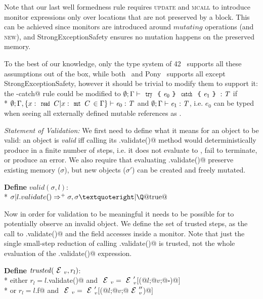 
Note that our last well formedness rule requires 
\textsc{update} and \textsc{mcall} to introduce
monitor expressions only over locations
that are not preserved by a \Q@try@ block.
This can be achieved since monitors are introduced
around $\mathit{mutating}$ operations
(and \textsc{new}),
and StrongExceptionSafety ensures no mutation happens on the preserved memory.

To the best of our knowledge, only the type system of 42~\cite{ServettoEtAl13a,ServettoZucca15}
 supports all these assumptions out of the box,
while both~\cite{GordonEtAl12} and Pony~\cite{clebsch2015deny,clebsch2017orca} supports all except StrongExceptionSafety,
however it should be trivial to modify them to support it:
the \Q@try-catch@ rule could be modified to
$\emptyset;\Gamma\vdash\Kw{try}\oC\e_0\cC\Kw{catch}\oC\e_1\cC:\T$
if\\* $\emptyset;
\Gamma,\{x:\Kw{read}\,C | x:\Kw{mut}\,C\,\in\Gamma\}
\vdash\e_0:\T$ and $\emptyset;\Gamma\vdash\e_1:\T$,
i.e. $e_0$ can be typed when seeing all externally defined mutable references as \Q@read@.

\loseSpace
\noindent\textit{Statement of Validation:}
We first need to define what it means for an object to be valid: an object is \emph{valid} iff calling its \Q@.validate()@ method would
deterministically produce \Q@true@ in a finite number of steps, i.e. it does not evaluate to \Q@false@, fail to terminate, or produce an error.
We also require that evaluating \Q@.validate()@ preserve existing memory ($\sigma$), but new objects ($\sigma'$) can be created and freely mutated.

\noindent\textbf{Define} $valid(\sigma,l)$:\\*
\indent $\sigma | l.validate()\Rightarrow^+ \sigma,\sigma’ | \text{\Q@true@}$

\noindent Now in order for validation to be meaningful it needs to be possible for \Q@validate@ to potentially observe an invalid object.
We define the set of trusted steps, 
as the call to \Q@.validate()@ and the field accesses inside a monitor.
Note that just the single small-step reduction
of calling \Q@.validate()@ is trusted, not the whole evaluation of the \Q@.validate()@ expression.


\noindent\textbf{Define} $\mathit{trusted}(\ctx_v,r_l)$:\\*
\indent either
$r_l=l$\Q@.validate()@ and
 $\ctx_v=\ctx_v'[$\Q@M(@$l$\Q@;@$v$\Q@;@$\square$\Q@)@$]$\\*
\indent or
$r_l=l$\Q@.f@ and
 $\ctx_v=\ctx_v'[$\Q@M(@$l$\Q@;@$v$\Q@;@$\ctx_v''$\Q@)@$]$

